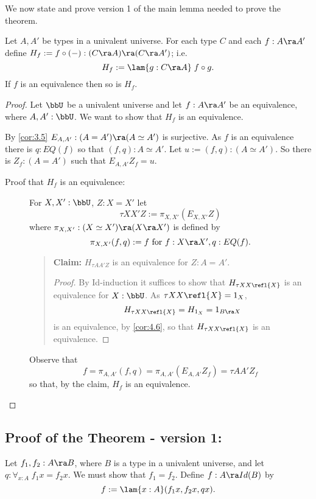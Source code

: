 We now state and  prove version 1 of the main lemma needed to prove the theorem.
\begin{lem}\label{fe:lem-main1}\label{lem:5.1}
Let $A,A'$ be types in a univalent universe.  For each type $C$ and each
$f:A\ra A'$ define $H_f := f\circ(-): (C\ra A)\ra (C\ra A')$; i.e.
  \[ H_f := \lam{g:C\ra A}\;  f\circ g.\]
If $f$ is an equivalence then so is $H_f$.
\end{lem}
\begin{proof} Let $\bbU$ be a univalent universe and let $f:A\ra A'$ be an equivalence, where $A,A':\bbU$.  We want to show that $H_f$ is an equivalence.

By \autoref{cor:3.5} $E_{A,A'}:(A=A')\ra (A\simeq A')$ is surjective.  
As $f$ is an equivalence there is $q:EQ(f)$ so that $(f,q):A\simeq A'$. Let $u:=(f,q):(A\simeq A')$.  So there is $Z_f:(A=A')$ such that $E_{A,A'}Z_f = u$.

\begin{description}
\item[Proof that $H_f$ is an equivalence:]
For $X,X':\bbU$, $Z:X=X'$ let 
  \[\tau X X' Z:= \pi_{X,X'}( E_{X,X'}Z)\]
where $\pi_{X,X'}:(X\simeq X')\ra (X\ra X')$ is defined by
  \[ \pi_{X,X'}(f,q):= f\mbox{ for $f:X\ra X',q:EQ(f)$}.\]
 \begin{quote}
{\bf Claim:} $H_{\tau A A' Z}$ is an equivalence for $Z:A=A'$.\\
\begin{proof} By Id-induction it suffices to show that $H_{\tau X X \refl{X}}$ is an equivalence for $X:\bbU$.  As $\tau X X\refl{X}=1_X$,
  \[ H_{\tau X X\refl{X}} = H_{1_X}=1_{B\ra X}\]
is an equivalence, by \autoref{cor:4.6}, so that 
$H_{\tau X X \refl{X}}$ is an equivalence.
\end{proof}
\end{quote}
Observe that
  \[ f = \pi_{A,A'}(f,q)=\pi_{A,A'}(E_{A,A'}Z_f)=\tau A A' Z_f\]
so that, by the claim, $H_f$ is an equivalence.
\end{description}
\end{proof}

\subsection{Proof of the Theorem - version 1: } 

Let $f_1,f_2:A\ra B$, where $B$ is a type in a univalent universe, and let 
$q:\forall_{x:A}\; f_1x=f_2x$.  We must show that $f_1=f_2$.
Define $f:A\ra Id(B)$ by
  \[ f := \lam{x:A}(f_1x,f_2x,qx).\]

